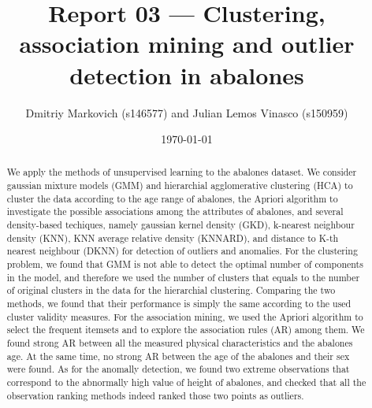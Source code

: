 \documentclass[10pt, paper=a4]{article}
\begin{document}
\title{Report 03 --- Clustering, association mining and outlier detection in
  abalones}

\author{Dmitriy Markovich (s146577) and Julian Lemos Vinasco (s150959)}

\date{\today}

\maketitle

\begin{abstract}

  We apply the methods of unsupervised learning to the abalones dataset.  We
  consider gaussian mixture models (GMM) and hierarchial agglomerative
  clustering (HCA) to cluster the data according to the age range of abalones,
  the Apriori algorithm to investigate the possible associations among the
  attributes of abalones, and several density-based techiques, namely gaussian
  kernel density (GKD), k-nearest neighbour density (KNN), KNN average relative
  density (KNNARD), and distance to K-th nearest neighbour (DKNN) for detection
  of outliers and anomalies.  For the clustering problem, we found that GMM is
  not able to detect the optimal number of components in the model, and
  therefore we used the number of clusters that equals to the number of original
  clusters in the data for the hierarchial clustering.  Comparing the two
  methods, we found that their performance is simply the same according to the
  used cluster validity measures.  For the association mining, we used the
  Apriori algorithm to select the frequent itemsets and to explore the
  association rules (AR) among them.  We found strong AR between all the
  measured physical characteristics and the abalones age.  At the same time, no
  strong AR between the age of the abalones and their sex were found.  As for
  the anomally detection, we found two extreme observations that correspond to
  the abnormally high value of height of abalones, and checked that all the
  observation ranking methods indeed ranked those two points as outliers.
\end{abstract}
\end{document}
